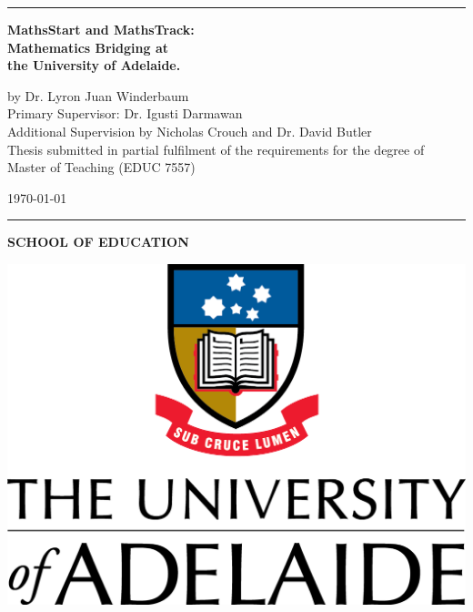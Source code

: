 \documentclass[twoside,12pt,a4paper]{report}
\begin{document}
\begin{titlepage}

\begin{flushleft}
\null
\vspace{2 cm}
\hrule
\vspace{1 cm}
{\huge{\bf MathsStart and MathsTrack: \\[2pt] Mathematics Bridging at \\[6pt] the University of Adelaide.}}
\vspace*{2cm}

\vspace{5.5 cm}
{\large by Dr. Lyron Juan Winderbaum}\\
\vspace{1 cm}
{\large Primary Supervisor: Dr. Igusti Darmawan}\\
\vspace{0.5 cm}
{\large Additional Supervision by Nicholas Crouch and Dr. David Butler}\\
\vspace{2 cm}
{ Thesis submitted in partial fulfilment of the requirements for the degree of Master of Teaching (EDUC 7557)}\\
\vspace{0.5 cm}
\end{flushleft}

\begin{flushright}
{\monthyeardate\today }
\end{flushright}

\vspace{0.5 cm}
\hrule
\vspace{0.65cm}

\begin{flushleft}
\textbf{SCHOOL OF EDUCATION}
\end{flushleft}
\vspace{-1.5cm}
\begin{flushright}
\includegraphics[scale=0.75]{./files/UoA_logo_col_vert.png}
\end{flushright}
\vspace{-2 cm}

\end{titlepage}
\end{document}
